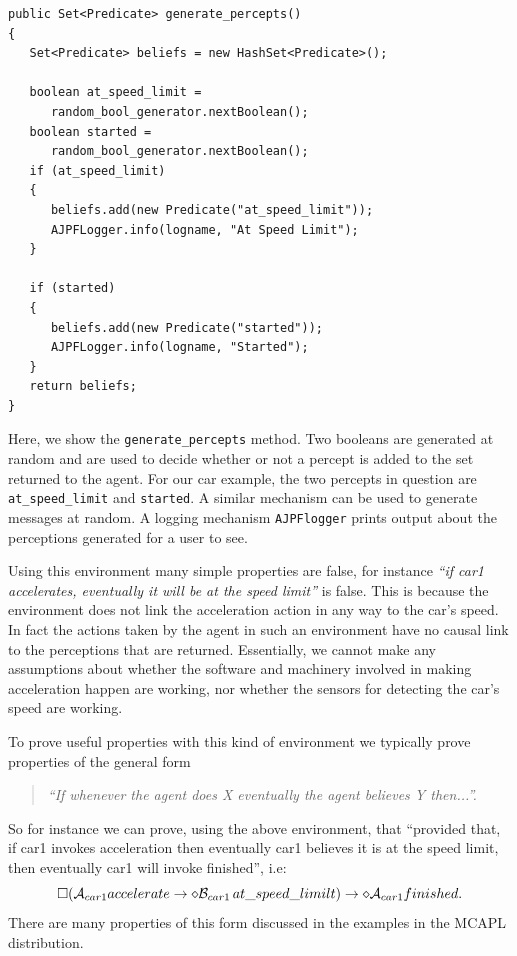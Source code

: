 \begin{ourexample}
\hspace{0.5cm}
\begin{lstlisting}[basicstyle=\footnotesize\sffamily,language=Gwendolen,style=easslisting]
public Set<Predicate> generate_percepts() 
{
   Set<Predicate> beliefs = new HashSet<Predicate>();
		
   boolean at_speed_limit =
      random_bool_generator.nextBoolean();
   boolean started =
      random_bool_generator.nextBoolean();
   if (at_speed_limit) 
   {
      beliefs.add(new Predicate("at_speed_limit"));
      AJPFLogger.info(logname, "At Speed Limit");
   }
		
   if (started) 
   {
      beliefs.add(new Predicate("started"));
      AJPFLogger.info(logname, "Started");
   }
   return beliefs;
}
\end{lstlisting}
Here, we show the \lstinline{generate_percepts} method.  Two booleans
are generated at random and are used to decide whether or not a
percept is added to the set returned to the agent.  For our car example,
the two percepts in question are \lstinline{at_speed_limit}
and \lstinline{started}.  A similar mechanism can be used to generate
messages at random.  A logging mechanism \texttt{AJPFlogger} prints output about the perceptions generated for a user to see.
\end{ourexample}

\noindent Using this environment many simple properties
 are false, for instance \emph{``if car1 accelerates, eventually it will be at the speed
limit''} is false.  This is because the environment does not link the
acceleration action in any way to the car's speed. In fact the actions
taken by the agent in such an environment have no causal link to the
perceptions that are returned. Essentially, we cannot make any
assumptions about whether the software and machinery involved in
making acceleration happen are working, nor whether the sensors for
detecting the car's speed are working.

To prove useful properties with this kind of environment we typically
prove properties of the general form
\begin{quote}
\emph{``If whenever the agent does X
eventually the agent believes Y then...''.}
\end{quote}
So for instance we can prove, using the above environment, that
``provided that, if car1 invokes acceleration then eventually car1
believes it is at the speed limit, then eventually car1 will invoke
finished'', i.e:
$$\Box
(\mathrm{{\cal A}}_{car1} accelerate \rightarrow \diamond
\mathrm{{\cal B}}_{car1} \, at\_speed\_limilt) \rightarrow \diamond
\mathrm{{\cal A}}_{car1} finished.
$$ 
%
There are many properties of
this form discussed in the examples in the MCAPL distribution.

